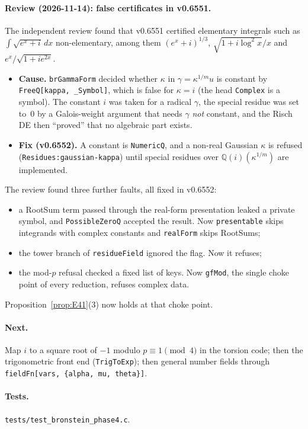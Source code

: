 \documentclass[11pt]{article}
\theoremstyle{definition}
\theoremstyle{remark}
\newcommand{\Q}{\mathbb{Q}}
\newcommand{\code}[1]{\texttt{#1}}
\begin{document}
\paragraph{Review (2026-11-14): false certificates in v0.6551.} The independent
review found that v0.6551 certified elementary integrals such as
$\int\sqrt{e^x+i}\,dx$ non-elementary, among them $(e^x+i)^{1/3}$,
$\sqrt{1+i\log^2x}/x$ and $e^x/\sqrt{1+ie^{2x}}$.
\begin{itemize}
\item \textbf{Cause.} \code{brGammaForm} decided whether $\kappa$ in
  $\gamma=\kappa^{1/m}u$ is constant by \code{FreeQ[kappa, \_Symbol]}, which is
  false for $\kappa=i$ (the head \code{Complex} is a symbol). The constant $i$
  was taken for a radical $\gamma$, the special residue was set to~$0$ by a
  Galois-weight argument that needs $\gamma$ \emph{not} constant, and the Risch
  DE then ``proved'' that no algebraic part exists.
\item \textbf{Fix (v0.6552).} A constant is \code{NumericQ}, and a non-real
  Gaussian $\kappa$ is refused (\code{Residues:gaussian-kappa}) until special
  residues over $\Q(i)(\kappa^{1/m})$ are implemented.
\end{itemize}
The review found three further faults, all fixed in v0.6552:
\begin{itemize}
\item a RootSum term passed through the real-form presentation leaked a private
  symbol, and \code{PossibleZeroQ} accepted the result. Now \code{presentable}
  skips integrands with complex constants and \code{realForm} skips RootSums;
\item the tower branch of \code{residueField} ignored the flag. Now it refuses;
\item the mod-$p$ refusal checked a fixed list of keys. Now \code{gfMod}, the
  single choke point of every reduction, refuses complex data.
\end{itemize}
Proposition~\ref{prop:E41}(3) now holds at that choke point.

\paragraph{Next.} Map $i$ to a square root of $-1$ modulo $p\equiv1\pmod4$ in
the torsion code; then the trigonometric front end (\code{TrigToExp}); then
general number fields through \code{fieldFn[vars, \{alpha, mu, theta\}]}.

\paragraph{Tests.} \code{tests/test\_bronstein\_phase4.c}.
\end{document}

